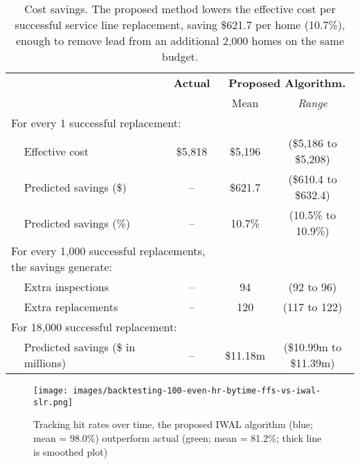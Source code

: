 \documentclass[sigconf]{acmart}
\begin{document}
\begin{table}
\centering
\scriptsize{
  \begin{tabular}{llccc}
  \hline
  						&	& \textbf{Actual}   	& \multicolumn{2}{c}{\textbf{Proposed Algorithm\quad\quad. }} \\
  						&	&  			& Mean	& \emph{Range} \\
  \hline
  \multicolumn{3}{l}{For every 1 successful replacement:} & &  \\
  & Effective cost 						& \$5,818 	& \$5,196		& (\$5,186 to \$5,208) \\
  & Predicted savings (\$)   				& -- 		& \$621.7		& (\$610.4 to \$632.4) \\
  & Predicted savings (\%)  				& -- 	 	& 10.7\% 		& (10.5\% to 10.9\%) \\
  \multicolumn{3}{l}{For every 1,000 successful replacements, the savings generate:} & &  \\
  & Extra inspections 			& -- 		& 94			& (92 to 96) \\
  & Extra replacements 			& --		& 120 			& (117 to 122) \\
  \multicolumn{3}{l}{For 18,000 successful replacement:} & & \\
  & Predicted savings (\$ in millions) & -- 		& \$11.18m  	& (\$10.99m to \$11.39m) \\
  \hline
  \end{tabular}
  \caption{Cost savings. The proposed method lowers the effective cost per successful service line replacement, saving \$621.7 per home (10.7\%), enough to remove lead from an additional 2,000 homes on the same budget.
  } \label{tbl:costs}
}
\end{table}
\begin{figure}[!t]
\begin{center}
\texttt{[image: images/backtesting-100-even-hr-bytime-ffs-vs-iwal-slr.png]}
\end{center}
\caption{
	Tracking hit rates over time, the proposed IWAL algorithm (blue; mean = 98.0\%) outperform actual (green; mean = 81.2\%; thick line is smoothed plot)
}
\label{fig:backtesting-100-even-ffs-vs-iwal}
\end{figure}
\end{document}
